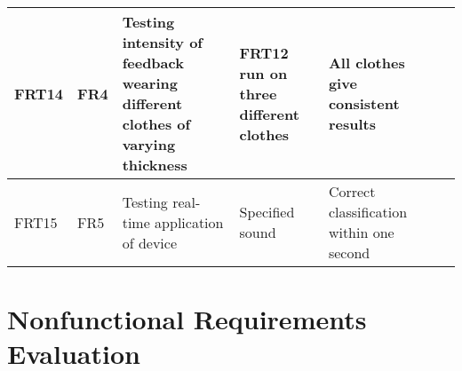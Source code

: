 \documentclass[12pt, titlepage]{article}
\begin{document}
\begin{longtable}{|p{1.4cm}|p{1cm}|p{3cm}|p{1.5cm}|p{2.5cm}|p{2cm}|p{1.2cm}|}
  FRT14       & FR4          & Testing intensity of feedback wearing different clothes of varying thickness & FRT12 run on three different clothes              & All clothes give consistent results                         &                        &                                                    \\ \hline
  FRT15       & FR5          & Testing real-time application of device                                      & Specified sound                                   & Correct classification within one second                    &                        &                                                    \\ \hline
\end{longtable}

\section{Nonfunctional Requirements Evaluation}
\end{document}
